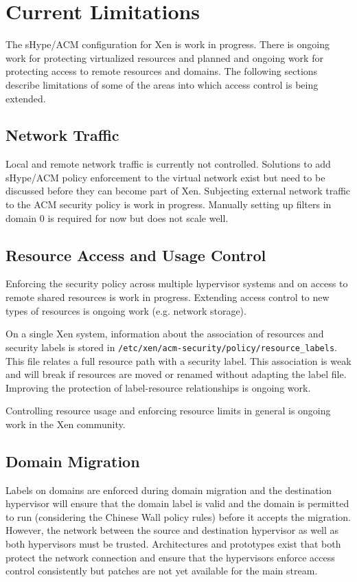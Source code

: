 \documentclass[11pt,twoside,final,openright]{report}
\begin{document}
\section{Current Limitations}
\label{section:acmlimitations}

The sHype/ACM configuration for Xen is work in progress. There is
ongoing work for protecting virtualized resources and planned and
ongoing work for protecting access to remote resources and domains.
The following sections describe limitations of some of the areas into
which access control is being extended.

\subsection{Network Traffic}
Local and remote network traffic is currently not controlled.
Solutions to add sHype/ACM policy enforcement to the virtual network
exist but need to be discussed before they can become part of Xen.
Subjecting external network traffic to the ACM security policy is work
in progress. Manually setting up filters in domain 0 is required for
now but does not scale well.

\subsection{Resource Access and Usage Control}

Enforcing the security policy across multiple hypervisor systems and
on access to remote shared resources is work in progress. Extending
access control to new types of resources is ongoing work (e.g. network
storage).

On a single Xen system, information about the association of resources
and security labels is stored in
\verb|/etc/xen/acm-security/policy/resource_labels|. This file relates
a full resource path with a security label. This association is weak
and will break if resources are moved or renamed without adapting the
label file. Improving the protection of label-resource relationships
is ongoing work.

Controlling resource usage and enforcing resource limits in general is
ongoing work in the Xen community.

\subsection{Domain Migration}

Labels on domains are enforced during domain migration and the
destination hypervisor will ensure that the domain label is valid and
the domain is permitted to run (considering the Chinese Wall policy
rules) before it accepts the migration.  However, the network between
the source and destination hypervisor as well as both hypervisors must
be trusted. Architectures and prototypes exist that both protect the
network connection and ensure that the hypervisors enforce access
control consistently but patches are not yet available for the main
stream.
\end{document}
